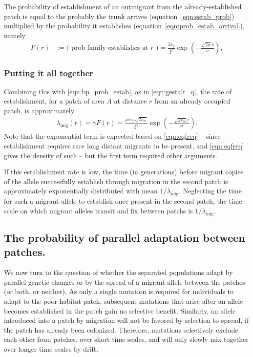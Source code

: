 \documentclass{article}
\newcommand{\migrate}{\lambda_\text{mig}}
\begin{document}
The probability of establishment of an outmigrant from the already-established patch is 
equal to the probably the trunk arrives (equation~\eqref{eqn:estab_prob}) multiplied by the probability it establishes (equation~\eqref{eqn:prob_estab_arrival}),
namely
\begin{align} \label{eqn:bp_prob_estab}
    F(r) &:= \text{( prob family establishes at $r$ )} = \frac{2s_p}{\xi^2} \exp\left( - \frac{\sqrt{2 \alpha} r}{\sigma} \right) ,
\end{align}



\subsubsection*{Putting it all together}

Combining this with \eqref{eqn:bp_prob_estab}, as in \eqref{eqn:gestalt_q}, 
the rate of establishment, for a patch of area $A$ at distance $r$ from an already occupied patch, is approximately
\begin{align} \label{eqn:migrate}
    \migrate(r) = \gamma F(r) = \frac{\rho \sigma s_p\sqrt{2s_m} }{\xi^2}  \exp\left( -\frac{ \sqrt{2 s_m} r}{\sigma} \right).
\end{align}
Note that the exponential term is expected based on \eqref{eqn:eqfreq} -- 
since establishment requires rare long distant migrants to be present, and \eqref{eqn:eqfreq} gives the density of such --
but the first term required other arguments.

If this establishment rate is low, 
the time (in generations) before migrant copies of the allele successfully establish through migration in the second patch
is approximately exponentially distributed with mean $1/\migrate$.
Neglecting the time for such a migrant allele to establish once present in the second patch,
the time scale on which migrant alleles transit and fix between patchs is $1/\migrate$.


\subsection{The probability of parallel adaptation between patches.} 
\label{ss:probparallel}

We now turn to the question of whether the separated populations adapt by parallel genetic changes 
or by the spread of a migrant allele between the patches
(or both, or neither).
As only a single mutation is required for individuals to adapt to the
poor habitat patch, subsequent mutations that arise after an allele becomes established in the patch gain no selective benefit. 
Similarly, an allele introduced into a patch by migration will not be favored by selection to spread, 
if the patch has already been colonized. 
Therefore, mutations selectively exclude each other from patches, over short time scales, 
and will only slowly mix together over longer time scales by drift. 
\end{document}
